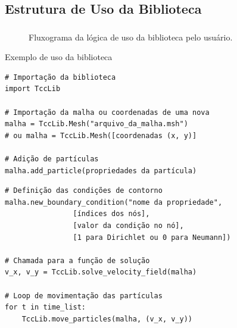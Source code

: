 \documentclass{beamer}
\begin{document}
\subsection{Estrutura de Uso da Biblioteca}
\begin{frame}[fragile]
  \frametitle{\subsecname}
  
  \begin{figure}
     {\raggedleft \tiny Fluxograma da lógica de uso da biblioteca pelo usuário.}
  \end{figure}
  
  
  \fontsize{5pt}{7.2}\selectfont
  \begin{minipage}{.48\textwidth}
  \begin{block}{Exemplo de uso da biblioteca}
    \begin{verbatim}
# Importação da biblioteca
import TccLib

# Importação da malha ou coordenadas de uma nova
malha = TccLib.Mesh("arquivo_da_malha.msh")
# ou malha = TccLib.Mesh([coordenadas (x, y)]

# Adição de partículas
malha.add_particle(propriedades da partícula)
    \end{verbatim}
  \end{block}
  \end{minipage}
  \hfill
  \begin{minipage}{.48\textwidth}
  \begin{block}{}
    \begin{verbatim}
# Definição das condições de contorno
malha.new_boundary_condition("nome da propriedade",
                [índices dos nós],
                [valor da condição no nó],
                [1 para Dirichlet ou 0 para Neumann])

# Chamada para a função de solução
v_x, v_y = TccLib.solve_velocity_field(malha)

# Loop de movimentação das partículas
for t in time_list:
    TccLib.move_particles(malha, (v_x, v_y))
    \end{verbatim}
  \end{block}
  \end{minipage}
\end{frame}
\end{document}
